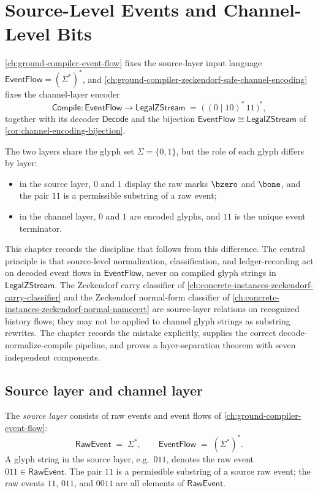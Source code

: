 \chapter{Source-Level Events and Channel-Level Bits}
\label{ch:ground-compiler-source-channel-layer-separation}

\autoref{ch:ground-compiler-event-flow} fixes the source-layer input language $\mathsf{EventFlow} = (\Sigma^{*})^{*}$, and \autoref{ch:ground-compiler-zeckendorf-safe-channel-encoding} fixes the channel-layer encoder
$$
  \mathsf{Compile} \colon \mathsf{EventFlow} \longrightarrow \mathsf{LegalZStream}
  \;=\; \big(\, (0 \mid 10)^{*}\,11 \,\big)^{*},
$$
together with its decoder $\mathsf{Decode}$ and the bijection $\mathsf{EventFlow} \cong \mathsf{LegalZStream}$ of \autoref{cor:channel-encoding-bijection}.

The two layers share the glyph set $\Sigma = \{0,1\}$, but the role of each glyph differs by layer:
\begin{itemize}
  \item in the source layer, $0$ and $1$ display the raw marks $\bzero$ and $\bone$, and the pair $11$ is a permissible substring of a raw event;
  \item in the channel layer, $0$ and $1$ are encoded glyphs, and $11$ is the unique event terminator.
\end{itemize}
This chapter records the discipline that follows from this difference. The central principle is that source-level normalization, classification, and ledger-recording act on decoded event flows in $\mathsf{EventFlow}$, never on compiled glyph strings in $\mathsf{LegalZStream}$. The Zeckendorf carry classifier of \autoref{ch:concrete-instances-zeckendorf-carry-classifier} and the Zeckendorf normal-form classifier of \autoref{ch:concrete-instances-zeckendorf-normal-namecert} are source-layer relations on recognized history flows; they may not be applied to channel glyph strings as substring rewrites. The chapter records the mistake explicitly, supplies the correct decode-normalize-compile pipeline, and proves a layer-separation theorem with seven independent components.

\section{Source layer and channel layer}
\label{sec:source-channel-source-and-channel-layers}

\begin{definition}
\label{def:source-channel-source-layer}
The \emph{source layer} consists of raw events and event flows of \autoref{ch:ground-compiler-event-flow}:
$$
  \mathsf{RawEvent} \;=\; \Sigma^{*},
  \qquad
  \mathsf{EventFlow} \;=\; (\Sigma^{*})^{*}.
$$
A glyph string in the source layer, e.g.\ $011$, denotes the raw event $011 \in \mathsf{RawEvent}$. The pair $11$ is a permissible substring of a source raw event; the raw events $11$, $011$, and $0011$ are all elements of $\mathsf{RawEvent}$.
\end{definition}

